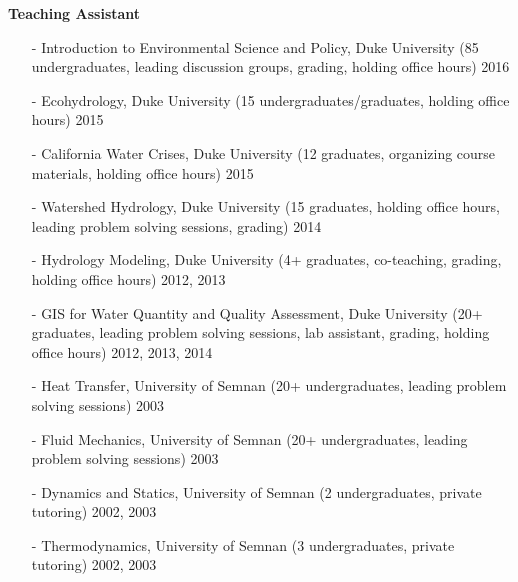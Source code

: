 \documentclass[10pt]{article}
\newenvironment{changemargin}[2]{%
  \begin{list}{}{%
 \setlength{\topsep}{0pt}%
 \setlength{\leftmargin}{#1}%
 \setlength{\rightmargin}{#2}%
 \setlength{\listparindent}{\parindent}%
 \setlength{\itemindent}{\parindent}%
 \setlength{\parsep}{\parskip}%
  }%
  \item[]}{\end{list}
}
\newenvironment{body} {
  \vspace*{-2pt}
  \begin{changemargin}{-0.5in}{-0.5in}
}
{\end{changemargin}
}
\begin{document}
\begin{body}
  \textbf {Teaching Assistant}\\
  \vspace*{-4pt}
  \begin{itemize} \itemsep -0pt
    \item[-]Introduction to Environmental Science and Policy, Duke University (85 undergraduates, leading discussion groups, grading, holding office hours) \hfill {2016}
    \item[-]Ecohydrology, Duke University (15 undergraduates/graduates, holding office hours) \hfill {2015}
    \item[-]California Water Crises, Duke University (12 graduates, organizing course materials, holding office hours) \hfill {2015}
    \item[-]Watershed Hydrology, Duke University (15 graduates, holding office hours, leading problem solving sessions, grading) \hfill {2014}
    \item[-]Hydrology Modeling, Duke University (4+ graduates, co-teaching, grading, holding office hours) \hfill {2012, 2013}
    \item[-]GIS for Water Quantity and Quality Assessment, Duke University (20+ graduates, leading problem solving sessions, lab assistant, grading, holding office hours) \hfill {2012, 2013, 2014}
    \item[-]Heat Transfer, University of Semnan  (20+ undergraduates,  leading problem solving sessions) \hfill {2003}
    \item[-]Fluid Mechanics, University of Semnan  (20+ undergraduates,  leading problem solving sessions) \hfill {2003}
    \item[-]Dynamics and Statics, University of Semnan (2 undergraduates, private tutoring) \hfill {2002, 2003}
    \item[-]Thermodynamics, University of Semnan  (3 undergraduates, private tutoring) \hfill {2002, 2003}
  \end{itemize}

  \medskip
\end{body}
\medskip
\end{document}
